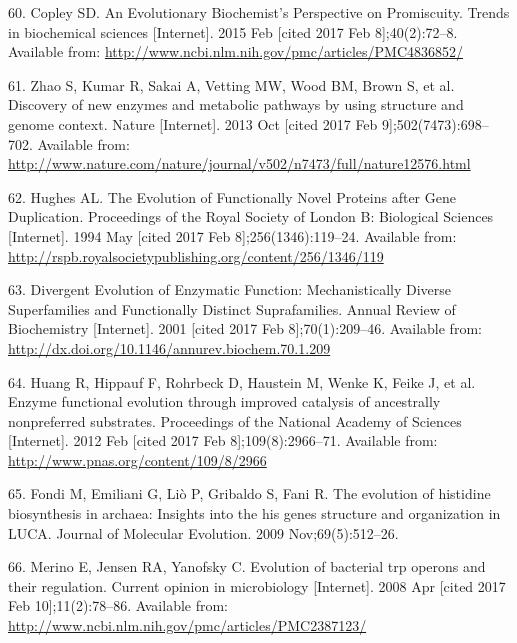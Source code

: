 \documentclass[12pt,twoside]{reedthesis}
\begin{document}
  \hypertarget{ref-copley_evolutionary_2015}{}
  60. Copley SD. An Evolutionary Biochemist's Perspective on Promiscuity.
  Trends in biochemical sciences {[}Internet{]}. 2015 Feb {[}cited 2017
  Feb 8{]};40(2):72--8. Available from:
  \url{http://www.ncbi.nlm.nih.gov/pmc/articles/PMC4836852/}
  
  \hypertarget{ref-zhao_discovery_2013}{}
  61. Zhao S, Kumar R, Sakai A, Vetting MW, Wood BM, Brown S, et al.
  Discovery of new enzymes and metabolic pathways by using structure and
  genome context. Nature {[}Internet{]}. 2013 Oct {[}cited 2017 Feb
  9{]};502(7473):698--702. Available from:
  \url{http://www.nature.com/nature/journal/v502/n7473/full/nature12576.html}
  
  \hypertarget{ref-hughes_evolution_1994}{}
  62. Hughes AL. The Evolution of Functionally Novel Proteins after Gene
  Duplication. Proceedings of the Royal Society of London B: Biological
  Sciences {[}Internet{]}. 1994 May {[}cited 2017 Feb
  8{]};256(1346):119--24. Available from:
  \url{http://rspb.royalsocietypublishing.org/content/256/1346/119}
  
  \hypertarget{ref-gerlt_divergent_2001}{}
  63. Divergent Evolution of Enzymatic Function: Mechanistically Diverse
  Superfamilies and Functionally Distinct Suprafamilies. Annual Review of
  Biochemistry {[}Internet{]}. 2001 {[}cited 2017 Feb 8{]};70(1):209--46.
  Available from: \url{http://dx.doi.org/10.1146/annurev.biochem.70.1.209}
  
  \hypertarget{ref-huang_enzyme_2012}{}
  64. Huang R, Hippauf F, Rohrbeck D, Haustein M, Wenke K, Feike J, et al.
  Enzyme functional evolution through improved catalysis of ancestrally
  nonpreferred substrates. Proceedings of the National Academy of Sciences
  {[}Internet{]}. 2012 Feb {[}cited 2017 Feb 8{]};109(8):2966--71.
  Available from: \url{http://www.pnas.org/content/109/8/2966}
  
  \hypertarget{ref-fondi_evolution_2009}{}
  65. Fondi M, Emiliani G, Liò P, Gribaldo S, Fani R. The evolution of
  histidine biosynthesis in archaea: Insights into the his genes structure
  and organization in LUCA. Journal of Molecular Evolution. 2009
  Nov;69(5):512--26.
  
  \hypertarget{ref-merino_evolution_2008}{}
  66. Merino E, Jensen RA, Yanofsky C. Evolution of bacterial trp operons
  and their regulation. Current opinion in microbiology {[}Internet{]}.
  2008 Apr {[}cited 2017 Feb 10{]};11(2):78--86. Available from:
  \url{http://www.ncbi.nlm.nih.gov/pmc/articles/PMC2387123/}
  
\end{document}
